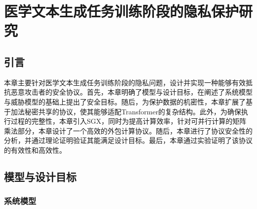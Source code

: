 
\chapter{医学文本生成任务训练阶段的隐私保护研究}

\section{引言}



本章主要针对医学文本生成任务训练阶段的隐私问题，设计并实现一种能够有效抵抗恶意攻击者的安全协议。首先，本章明确了模型与设计目标，在阐述了系统模型与威胁模型的基础上提出了安全目标。随后，为保护数据的机密性，本章扩展了基于加法秘密共享的协议，使其能够适配Transformer的复杂结构。此外，为确保执行过程的完整性，本章引入SGX，同时为提高计算效率，针对可并行计算的矩阵乘法部分，本章设计了一个高效的外包计算协议。随后，本章进行了协议安全性的分析，并通过理论证明验证其能满足设计目标。最后，本章通过实验证明了该协议的有效性和高效性。


\section{模型与设计目标} \label{chap2_system_model}

\subsection{系统模型}


